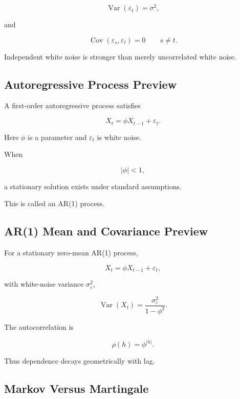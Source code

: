 \[
\boxed{
\operatorname{Var}(\varepsilon_t)=\sigma^2,
}
\]

and

\[
\boxed{
\operatorname{Cov}
(
\varepsilon_s,\varepsilon_t
)
=
0
\qquad
s\neq t.
}
\]

Independent white noise is stronger than merely uncorrelated white
noise.

\subsection{Autoregressive Process Preview}
\label{subsec:autoregressive-process-preview}

A first-order autoregressive process satisfies

\[
\boxed{
X_t
=
\phi X_{t-1}
+
\varepsilon_t.
}
\]

Here \(\phi\) is a parameter and \(\varepsilon_t\) is white noise.

When

\[
|\phi|<1,
\]

a stationary solution exists under standard assumptions.

This is called an AR(1) process.

\subsection{AR(1) Mean and Covariance Preview}
\label{subsec:ar1-covariance-preview}

For a stationary zero-mean AR(1) process,

\[
X_t
=
\phi X_{t-1}
+
\varepsilon_t,
\]

with white-noise variance \(\sigma_\varepsilon^2\),

\[
\boxed{
\operatorname{Var}(X_t)
=
\frac{
\sigma_\varepsilon^2
}{
1-\phi^2
}.
}
\]

The autocorrelation is

\[
\boxed{
\rho(h)
=
\phi^{|h|}.
}
\]

Thus dependence decays geometrically with lag.

\subsection{Markov Versus Martingale}
\label{subsec:markov-versus-martingale}

